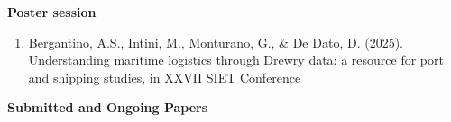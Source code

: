\documentclass[11pt,a4paper,sans]{moderncv} %
\begin{document}
\textbf{Poster session}

\begin{enumerate}[label=\arabic*.] 
\item  Bergantino, A.S., Intini, M., Monturano, G., \& De Dato, D.  (2025). Understanding maritime logistics through Drewry data: a resource for port and shipping studies, in XXVII SIET Conference 
\end{enumerate}








\textbf{Submitted and Ongoing Papers}
\end{document}
